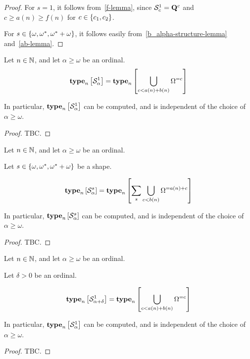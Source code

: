 \begin{proof}
    For $s = 1$, it follows from~\cref{f-lemma},
    since $\mathcal{S}^{1}_{c} = \mathbf{Q}^{c}$
    and $c \ge a(n) \ge f(n)$ for $c \in \left\{ {c_1, c_2} \right\}$.

    For $s \in \left\{ {\omega, \omega^\ast, \omega^\ast + \omega} \right\}$, it follows easily from~\cref{b_alpha-structure-lemma}
    and~\cref{ab-lemma}.
\end{proof}

\begin{lemma}
    Let $n \in \mathbb{N}$, and let $\alpha \ge \omega$ be an ordinal.
    \[
        \mathbf{type}_{n} \left[ {\mathcal{S}^{1}_{\alpha}} \right]
        = \mathbf{type}_{n} \left[ {\bigcup_{c < a(n) + b(n)} {\Omega^{= c}}} \right]
    \]

    In particular, $\mathbf{type}_{n} \left[ {\mathcal{S}^{1}_{\alpha}} \right]$ can be
    computed, and is independent of the choice of $\alpha \ge \omega$.
\end{lemma}

\begin{proof}
    TBC.
\end{proof}

\begin{lemma}
    Let $n \in \mathbb{N}$, and let $\alpha \ge \omega$ be an ordinal.

    Let $s \in \left\{ {\omega, \omega^\ast, \omega^\ast + \omega} \right\}$ be a shape.

    \[
        \mathbf{type}_{n} \left[ {\mathcal{S}^{s}_{\alpha}} \right]
        = \mathbf{type}_{n} \left[ {\sum_{s} {\bigcup_{c < b(n)}{\Omega^{= a(n) + c}}}} \right]
    \]

    In particular, $\mathbf{type}_{n} \left[ {\mathcal{S}^{s}_{\alpha}} \right]$ can be
    computed, and is independent of the choice of $\alpha \ge \omega$.
\end{lemma}

\begin{proof}
    TBC.
\end{proof}


\begin{lemma}
    Let $n \in \mathbb{N}$, and let $\alpha \ge \omega$ be an ordinal.

    Let $\delta > 0$ be an ordinal.

    \[
        \mathbf{type}_{n} \left[ {\mathcal{S}^{1}_{\alpha + \delta}} \right]
        = \mathbf{type}_{n} \left[ {\bigcup_{c < a(n) + b(n)} {\Omega^{= c}}} \right]
    \]

    In particular, $\mathbf{type}_{n} \left[ {\mathcal{S}^{1}_{\alpha}} \right]$ can be
    computed, and is independent of the choice of $\alpha \ge \omega$.
\end{lemma}

\begin{proof}
    TBC.
\end{proof}
